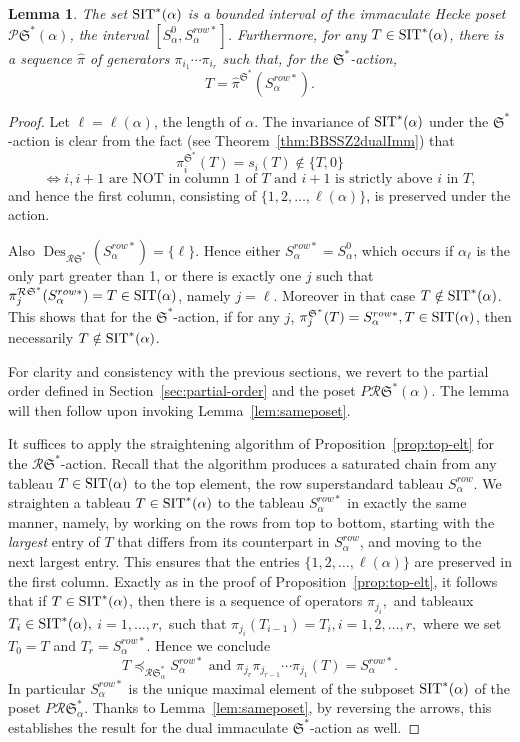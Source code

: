 \documentclass[12pt,letterpaper]{amsart}
\newtheorem{lemma}[theorem]{Lemma}
\theoremstyle{definition}
\newcommand{\poRI}{\preccurlyeq_{\mathcal{R}{\mathfrak{S}}^\ast _\alpha}}  \newcommand{\poA}{\preccurlyeq_{\mathcal{A}^\ast _\alpha}}  \newcommand{\poAbar}{\preccurlyeq_{\mathcal{\bar{A}}^\ast _\alpha} } \newcommand{\poRIcover}{\prec_{\mathcal{R}{\mathfrak{S}}^\ast _\alpha}}
\newcommand{\dI}{\mathfrak{S}^*}
\newcommand{\rdI}{\mathcal{R}\mathfrak{S}^*}
\DeclareMathOperator{\Des}{Des}
\begin{document}
\begin{lemma}\label{lem:SIT*-interval} The set $\operatorname{SIT}^*(\alpha)$ is a bounded interval of the immaculate Hecke poset $\mathcal{P}\dI(\alpha)$, the interval $[S^0_\alpha, S^{row*}_\alpha]$.  Furthermore, for any $T\in \operatorname{SIT}^*(\alpha)$, 
there is a sequence $\hat\pi$ of generators  $\pi_{i_1}\cdots\pi_{i_r}$ such that, for the $\dI$-action, 
\[T=\hat\pi^{\dI}(S^{row*}_\alpha).\]
\end{lemma}
\begin{proof} Let $\ell=\ell(\alpha)$, the length of $\alpha$. The invariance of $\operatorname{SIT}^*(\alpha)$ under the $\dI$-action is clear from the fact (see Theorem~\ref{thm:BBSSZ2dualImm}) that 
\[\pi^{\dI}_i(T)=s_i(T)\notin \{ T,0\}\]
\[ \iff  i, i+1 \text{ are NOT in column 1 of $T$ and $i+1$ is strictly above $i$ in $T$},\] 
and hence the first column, consisting of $\{1,2,\ldots,\ell(\alpha)\}$,  is preserved under the action.  

Also $\Des_{\rdI}(S^{row*}_\alpha)=\{\ell\}$. Hence either $S^{row*}_\alpha=S^{0}_\alpha$, which occurs if $\alpha_\ell$ is the only part greater than 1, or there is exactly one $j$ such that $\pi_j^{\rdI}(S^{row*}_\alpha)=T\in\SIT(\alpha)$,  namely $j=\ell$. Moreover in that case $T\notin \operatorname{SIT}^*(\alpha)$.  This shows that for the $\dI$-action, if for any $j$, $\pi_j^{\dI}(T)=S^{row*}_\alpha  , T\in \SIT(\alpha)$, then necessarily $T \notin \operatorname{SIT}^*(\alpha)$. 

For clarity and consistency with the previous sections, we revert to the partial order defined in Section~\ref{sec:partial-order} and the poset $P\rdI(\alpha)$. The lemma will then follow upon invoking 
Lemma~\ref{lem:sameposet}.

It suffices to apply the straightening algorithm of Proposition~\ref{prop:top-elt} for the $\rdI$-action. 
Recall that the algorithm produces a saturated chain from any tableau $T\in\operatorname{SIT}(\alpha)$ to the top element, the row superstandard tableau $S^{row}_\alpha.$ 
We straighten a tableau $T\in \operatorname{SIT}^*(\alpha)$ to the tableau $S^{row*}_\alpha$ in exactly the same manner,  namely, by working on the rows from top to bottom, starting with the \textit{largest} entry of $T$ that differs from its counterpart in $S^{row}_\alpha$, and moving to the next largest entry. This ensures that the entries $\{1,2,\ldots,\ell(\alpha)\}$ are preserved in the first column. 
Exactly as in the proof of  Proposition~\ref{prop:top-elt}, it follows that if $T\in \operatorname{SIT}^*(\alpha)$, then there is a sequence of operators $\pi_{j_i}, $ and tableaux $T_i\in \operatorname{SIT}^*(\alpha),$ $i=1,\ldots, r,$ such that $\pi_{j_i}(T_{i-1})=T_{i}, i=1,2,\ldots ,r,$ where we set $T_{0}=T$ and $T_r=S^{row*}_\alpha.$ Hence we conclude 
\[ T \poRI S^{row*}_\alpha \text{ and } \pi_{j_r}\pi_{j_{r-1}}\cdots\pi_{j_1}(T)=S^{row*}_\alpha.\]
In particular $S^{row*}_\alpha$ is the unique maximal element of the subposet $\operatorname{SIT}^*(\alpha)$ of the poset $P\rdI_\alpha.$  
Thanks to Lemma~\ref{lem:sameposet}, by reversing the arrows, this establishes the result for the dual immaculate $\dI$-action as well.
\end{proof}
\end{document}
